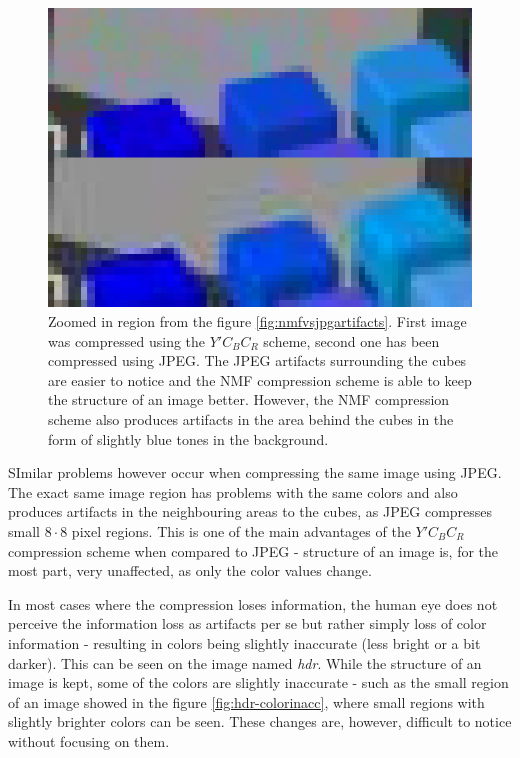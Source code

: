 \documentclass[thesis=M,english]{FITthesis}[2012/10/20]
\begin{document}
\begin{figure}
  \centering
  \includegraphics[scale=0.5]{imgs/results/nmfjpgzoom}
  \caption[Zoomed in artifact comparison between JPEG and NMF $Y'C_BC_R$ compression scheme]{Zoomed in region from the figure \ref{fig:nmfvsjpgartifacts}. First image
           was compressed using the $Y'C_BC_R$ scheme, second one has been compressed
           using JPEG. The JPEG artifacts surrounding the cubes are easier to notice
           and the NMF compression scheme is able to keep the structure of an image
           better. However, the NMF compression scheme also produces artifacts in the
           area behind the cubes in the form of slightly blue tones in the background.}
  \label{fig:nmfvsjpgzoom}
\end{figure}

SImilar problems however occur when compressing the same image using JPEG.
The exact same image region has problems with the same colors and also produces artifacts in the
neighbouring areas to the cubes, as JPEG compresses small $8 \cdot 8$ pixel regions.
This is one of the main advantages of the $Y'C_BC_R$ compression scheme when
compared to JPEG - structure of an image is, for the most part, very unaffected,
as only the color values change.

In most cases where the compression loses information, the human eye does not perceive
the information loss as artifacts per se but rather simply loss of color information - resulting
in colors being slightly inaccurate (less bright or a bit darker). This can be seen on the
image named \emph{hdr}. While the structure of an image is kept, some of the colors are slightly
inaccurate - such as the small region of an image showed in the figure \ref{fig:hdr-colorinacc},
where small regions with slightly brighter colors can be seen. These changes are, however, difficult
to notice without focusing on them.
\end{document}

